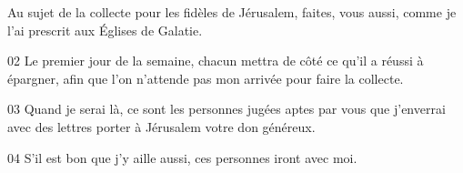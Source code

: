 Au sujet de la collecte pour les fidèles de Jérusalem, faites, vous aussi, comme je l’ai prescrit aux Églises de Galatie.

02 Le premier jour de la semaine, chacun mettra de côté ce qu’il a réussi à épargner, afin que l’on n’attende pas mon arrivée pour faire la collecte.

03 Quand je serai là, ce sont les personnes jugées aptes par vous que j’enverrai avec des lettres porter à Jérusalem votre don généreux.

04 S’il est bon que j’y aille aussi, ces personnes iront avec moi.
